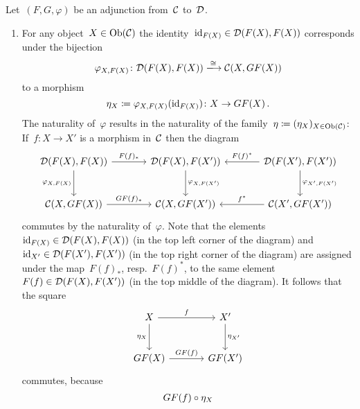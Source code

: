 \begin{remark}[label = triangle equalities]
  Let~$(F,G,\varphi)$ be an adjunction from~$\mathcal{C}$ to~$\mathcal{D}$.
  \begin{enumerate}
    \item
      For any object~$X \in \operatorname{Ob}(\mathcal{C})$ the identity~$\operatorname{id}_{F(X)} \in \mathcal{D}(F(X), F(X))$ corresponds under the bijection
      \[
                        \varphi_{X,F(X)}
        \colon          \Dcat(F(X), F(X))
        \xlongto{\cong} \Ccat(X, GF(X))
      \]
      to a morphism
      \[
                  \eta_X
        \coloneqq  \varphi_{X,F(X)}(\operatorname{id}_{F(X)})
        \colon    X
        \to       GF(X) \,.
      \]
      The naturality of~$\varphi$ results in the naturality of the family~$\eta \coloneqq (\eta_X)_{X \in \operatorname{Ob}(\mathcal{C})}$:
      If~$f \colon X \to X'$ is a morphism in~$\mathcal{C}$ then the diagram
      \begin{equation}
        \label{big diagram}
        \begin{tikzcd}[sep = large]
            \Dcat(F(X), F(X))
            \arrow{r}[above]{F(f)_*}
            \arrow{d}[left]{\varphi_{X,F(X)}}
          & \Dcat(F(X), F(X'))
            \arrow{d}{\varphi_{X,F(X')}}
          & \Dcat(F(X'), F(X'))
            \arrow{l}[above]{F(f)^*}
            \arrow{d}[right]{\varphi_{X',F(X')}}
          \\
            \Ccat(X, GF(X))
            \arrow{r}[above]{GF(f)_*}
          & \Ccat(X, GF(X'))
          & \Ccat(X', GF(X'))
            \arrow{l}[above]{f^*}
        \end{tikzcd}
      \end{equation}
      commutes by the naturality of~$\varphi$.
      Note that the elements~$\operatorname{id}_{F(X)} \in \mathcal{D}(F(X), F(X))$ (in the top left corner of the diagram) and~$\operatorname{id}_{X'} \in \mathcal{D}(F(X'), F(X'))$ (in the top right corner of the diagram) are assigned under the map~$F(f)_*$, resp.~$F(f)^*$, to the same element~$F(f) \in \mathcal{D}(F(X), F(X'))$ (in the top middle of the diagram).
      It follows that the square
      \[
        \begin{tikzcd}[sep = large]
            X
            \arrow{r}[above]{f}
            \arrow{d}[left]{\eta_X}
          & X'
            \arrow{d}[right]{\eta_{X'}}
          \\
            GF(X)
            \arrow{r}[above]{GF(f)}
          & GF(X')
        \end{tikzcd}
      \]
      commutes, because
      \begin{align}
         {}&  GF(f) \circ \eta_X  \notag  \\

\end{align}
\end{enumerate}
\end{remark}
